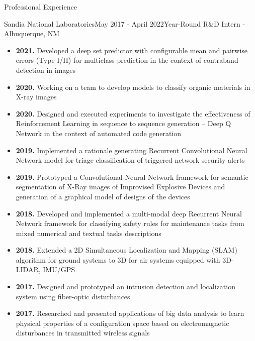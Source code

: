\documentclass{resume} %
\begin{document}
\begin{rSection}{Professional Experience}
\begin{rSubsection}{Sandia National Laboratories}{May 2017 - April 2022}{Year-Round R\&D Intern - Albuquerque, NM}
\begin{itemize}[label={}]
    \setlength\itemsep{0em}
    \item \textbf{2021.} Developed a deep set predictor with configurable mean and pairwise errors (Type I/II) for multiclass prediction in the context of contraband detection in images
    \item \textbf{2020.} Working on a team to develop models to classify organic materials in X-ray images
    \item \textbf{2020.} Designed and executed experiments to investigate the effectiveness of Reinforcement Learning in sequence to sequence generation -- Deep Q Network in the context of automated code generation
    \item \textbf{2019.} Implemented a rationale generating Recurrent Convolutional Neural Network model for triage classification of triggered network security alerts
    \item \textbf{2019.} Prototyped a Convolutional Neural Network framework for semantic segmentation of X-Ray images of Improvised Explosive Devices and generation of a graphical model of designs of the devices
    \item \textbf{2018.} Developed and implemented a multi-modal deep Recurrent Neural Network framework for classifying safety rules for maintenance tasks from mixed numerical and textual tasks descriptions
    \item \textbf{2018.} Extended a 2D Simultaneous Localization and Mapping (SLAM) algorithm for ground systems to 3D for air systems equipped with 3D-LIDAR, IMU/GPS
    \item \textbf{2017.} Designed and prototyped an intrusion detection and localization system using fiber-optic disturbances 
    \item \textbf{2017.} Researched and presented applications of big data analysis to learn physical properties of a configuration space based on electromagnetic disturbances in transmitted wireless signals
\end{itemize}

\end{rSubsection}
\end{rSection}

\end{document}
